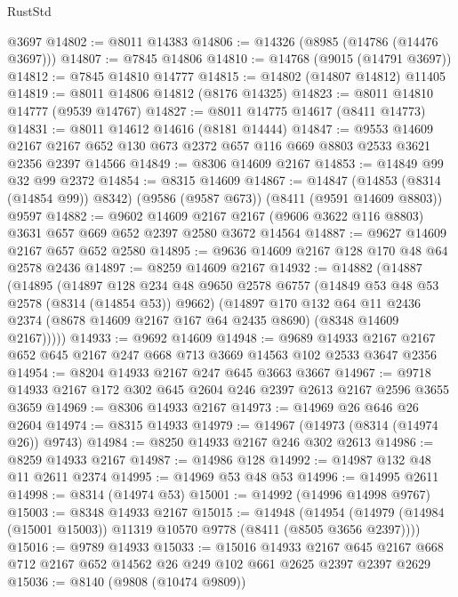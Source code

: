 \begin{lexlean}{RustStd}
\begin{coremodule}
    @3697
@14802 := @8011 @14383
@14806 := @14326 (@8985 (@14786 (@14476 @3697)))
@14807 := @7845 @14806
@14810 := @14768 (@9015 (@14791 @3697))
@14812 := @7845 @14810 @14777
@14815 := @14802 (@14807 @14812) @11405
@14819 := @8011 @14806 @14812 (@8176 @14325)
@14823 := @8011 @14810 @14777 (@9539 @14767)
@14827 := @8011 @14775 @14617 (@8411 @14773)
@14831 := @8011 @14612 @14616 (@8181 @14444)
@14847 := @9553
    @14609
    @2167
    @2167
    @652
    @130
    @673
    @2372
    @657
    @116
    @669
    @8803
    @2533
    @3621
    @2356
    @2397
    @14566
@14849 := @8306 @14609 @2167
@14853 := @14849 @99 @32 @99 @2372
@14854 := @8315 @14609
@14867 := @14847
    (@14853 (@8314 (@14854 @99)) @8342)
    (@9586 (@9587 @673))
    (@8411 (@9591 @14609 @8803))
    @9597
@14882 := @9602
    @14609
    @2167
    @2167
    (@9606 @3622 @116 @8803)
    @3631
    @657
    @669
    @652
    @2397
    @2580
    @3672
    @14564
@14887 := @9627 @14609 @2167 @657 @652 @2580
@14895 := @9636 @14609 @2167 @128 @170 @48 @64 @2578 @2436
@14897 := @8259 @14609 @2167
@14932 := @14882
    (@14887
      (@14895
        (@14897
          @128
          @234
          @48
          @9650
          @2578
          @6757
          (@14849 @53 @48 @53 @2578 (@8314 (@14854 @53)) @9662)
          (@14897
            @170
            @132
            @64
            @11
            @2436
            @2374
            (@8678 @14609 @2167 @167 @64 @2435 @8690)
            (@8348 @14609 @2167)))))
@14933 := @9692 @14609
@14948 := @9689
    @14933
    @2167
    @2167
    @652
    @645
    @2167
    @247
    @668
    @713
    @3669
    @14563
    @102
    @2533
    @3647
    @2356
@14954 := @8204 @14933 @2167 @247 @645 @3663 @3667
@14967 := @9718 @14933 @2167 @172 @302 @645 @2604 @246 @2397 @2613 @2167 @2596 @3655 @3659
@14969 := @8306 @14933 @2167
@14973 := @14969 @26 @646 @26 @2604
@14974 := @8315 @14933
@14979 := @14967 (@14973 (@8314 (@14974 @26)) @9743)
@14984 := @8250 @14933 @2167 @246 @302 @2613
@14986 := @8259 @14933 @2167
@14987 := @14986 @128
@14992 := @14987 @132 @48 @11 @2611 @2374
@14995 := @14969 @53 @48 @53
@14996 := @14995 @2611
@14998 := @8314 (@14974 @53)
@15001 := @14992 (@14996 @14998 @9767)
@15003 := @8348 @14933 @2167
@15015 := @14948
    (@14954 (@14979 (@14984 (@15001 @15003)) @11319 @10570 @9778 (@8411 (@8505 @3656 @2397))))
@15016 := @9789 @14933
@15033 := @15016
    @14933
    @2167
    @645
    @2167
    @668
    @712
    @2167
    @652
    @14562
    @26
    @249
    @102
    @661
    @2625
    @2397
    @2397
    @2629
@15036 := @8140 (@9808 (@10474 @9809))

\end{coremodule}
\end{lexlean}
